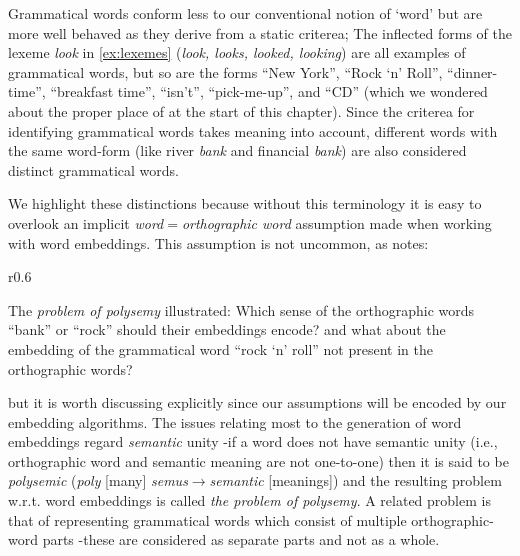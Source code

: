 
\begin{example}
  Grammatical words conform less to our conventional notion of `word' but are more well behaved as they derive from a static criterea; The inflected forms of the lexeme \emph{look} in \autoref{ex:lexemes} (\emph{look, looks, looked, looking}) are all examples of grammatical words, but so are the forms ``New York'', ``Rock `n' Roll'', ``dinner-time'', ``breakfast time'', ``isn't'', ``pick-me-up'', and ``CD'' (which we wondered about the proper place of at the start of this chapter). Since the criterea for identifying grammatical words takes meaning into account, different words with the same word-form (like river \emph{bank} and financial \emph{bank}) are also considered distinct grammatical words.
\end{example}
We highlight these distinctions because without this terminology it is easy to overlook an implicit \emph{word}$=$\emph{orthographic word} assumption made when working with word embeddings. This assumption is not uncommon, as \citeauthor{dixon02-word} notes:
\par
\begin{figurewrap}[13]{r}{0.6\textwidth}
  \vspace{-2.5em}
  \captionsetup{width=.55\textwidth}
  \centering
  
  \caption{The \emph{problem of polysemy} illustrated: Which sense of the orthographic words ``bank'' or ``rock'' should their embeddings encode? and what about the embedding of the grammatical word ``rock `n' roll'' not present in the orthographic words?}\label{fig:polysemy}
\end{figurewrap}
\par
but it is worth discussing explicitly since our assumptions will be encoded by our embedding algorithms. The issues relating most to the generation of word embeddings regard \emph{semantic} unity -if a word does not have semantic unity (i.e., orthographic word and semantic meaning are not one-to-one) then it is said to be \emph{polysemic} (\emph{poly} [many] \emph{semus$\rightarrow$semantic} [meanings]) and the resulting problem w.r.t. word embeddings is called \emph{the problem of polysemy}. A related problem is that of representing grammatical words which consist of multiple orthographic-word parts -these are considered as separate parts and not as a whole.
